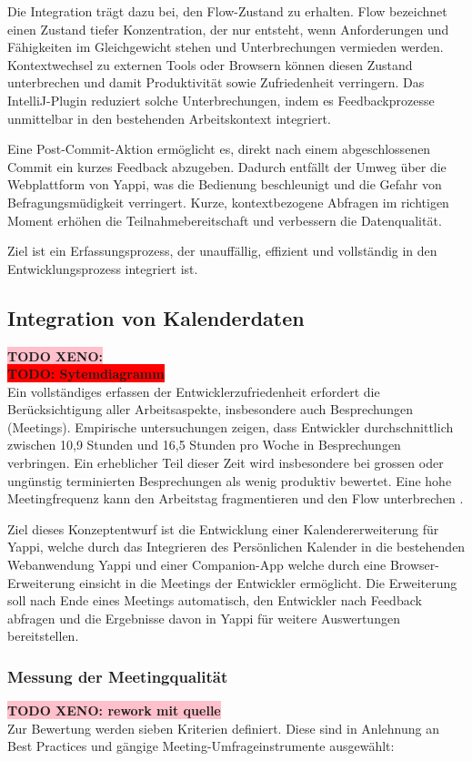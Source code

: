 \documentclass[12pt,a4paper]{report}
\newcommand{\todo}[1]{\colorbox{red}{\textbf{TODO: #1}}\\}
\newcommand{\xeno}[1]{\colorbox{pink}{\textbf{TODO XENO: #1}}\\}
\begin{document}
Die Integration trägt dazu bei, den Flow-Zustand zu erhalten.
Flow bezeichnet einen Zustand tiefer Konzentration, der nur entsteht, wenn Anforderungen und Fähigkeiten
im Gleichgewicht stehen und Unterbrechungen vermieden werden.
Kontextwechsel zu externen Tools oder Browsern können diesen Zustand unterbrechen und damit Produktivität sowie Zufriedenheit verringern.
Das IntelliJ-Plugin reduziert solche Unterbrechungen, indem es Feedbackprozesse unmittelbar in den bestehenden Arbeitskontext integriert.

Eine Post-Commit-Aktion ermöglicht es, direkt nach einem abgeschlossenen Commit ein kurzes Feedback abzugeben.
Dadurch entfällt der Umweg über die Webplattform von Yappi, was die Bedienung beschleunigt und die Gefahr von Befragungsmüdigkeit verringert.
Kurze, kontextbezogene Abfragen im richtigen Moment erhöhen die Teilnahmebereitschaft und verbessern die Datenqualität.

Ziel ist ein Erfassungsprozess, der unauffällig, effizient und vollständig in den Entwicklungsprozess integriert ist.


\subsection{Integration von Kalenderdaten}
\xeno{}
\todo{Sytemdiagramm}

Ein vollständiges erfassen der Entwicklerzufriedenheit erfordert die Berücksichtigung aller Arbeitsaspekte,
insbesondere auch Besprechungen (Meetings). Empirische untersuchungen zeigen, dass Entwickler durchschnittlich zwischen
10,9 Stunden und 16,5 Stunden pro Woche in Besprechungen verbringen. Ein erheblicher Teil dieser Zeit wird insbesondere
bei grossen oder ungünstig terminierten Besprechungen als wenig produktiv bewertet.
Eine hohe Meetingfrequenz kann den Arbeitstag fragmentieren und den Flow unterbrechen \cite{stray_understanding_2020, meyer_today_2021}.

Ziel dieses Konzeptentwurf ist die Entwicklung einer Kalendererweiterung für Yappi, welche durch das Integrieren des Persönlichen Kalender
in die bestehenden Webanwendung Yappi und einer Companion-App welche durch eine Browser-Erweiterung einsicht in die Meetings der Entwickler ermöglicht.
Die Erweiterung soll nach Ende eines Meetings automatisch, den Entwickler nach Feedback abfragen und die Ergebnisse davon in Yappi für weitere Auswertungen bereitstellen.

\subsubsection{Messung der Meetingqualität}
\xeno{rework mit quelle}
Zur Bewertung werden sieben Kriterien definiert. Diese sind in Anlehnung an Best Practices und gängige Meeting-Umfrageinstrumente ausgewählt:
\end{document}
